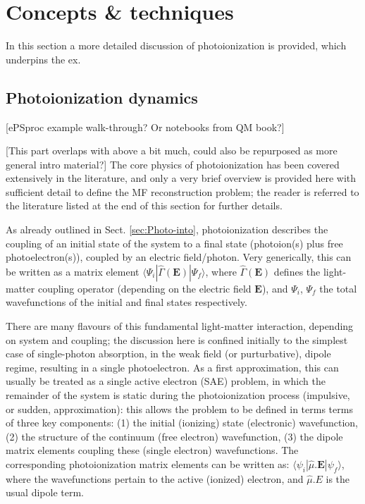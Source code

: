 \section{Concepts \& techniques\label{sec:Concepts}}

In this section a more detailed discussion of photoionization is provided, which underpins the ex.

\subsection{Photoionization dynamics} 
[ePSproc example walk-through? Or notebooks from QM book?]

[This part overlaps with above a bit much, could also be repurposed as more general intro material?]
The core physics of photoionization has been covered extensively in the literature, and only a very brief overview is provided here with sufficient detail to define the MF reconstruction problem; the reader is referred to the literature listed at the end of this section for further details.

As already outlined in Sect. \ref{sec:Photo-into}, photoionization describes the coupling of an initial state of the system to a final state (photoion(s) plus free photoelectron(s)), coupled by an electric field/photon. Very generically, this can be written as a matrix element $\langle\Psi_i|\hat{\Gamma}(\boldsymbol{\mathbf{E}})|\Psi_f\rangle$, where $\hat{\Gamma}(\boldsymbol{\mathbf{E}})$ defines the light-matter coupling operator (depending on the electric field $\boldsymbol{\mathbf{E}}$), and $\Psi_i$, $\Psi_f$ the total wavefunctions of the initial and final states respectively. 

There are many flavours of this fundamental light-matter interaction, depending on system and coupling; the discussion here is confined initially to the simplest case of single-photon absorption, in the weak field (or purturbative), dipole regime, resulting in a single photoelectron.
As a first approximation, this can usually be treated as a single active electron (SAE) problem, in which the remainder of the system is static during the photoionization process (impulsive, or sudden, approximation): this allows the problem to be defined in terms terms of three key components: (1) the initial (ionizing) state (electronic) wavefunction, (2) the structure of the continuum (free electron) wavefunction, (3) the dipole matrix elements coupling these (single electron) wavefunctions. The corresponding photoionization matrix elements can be written as: $\langle\psi_i|\hat{\mu}.\boldsymbol{\mathbf{E}}|\psi_f\rangle$, where the wavefunctions pertain to the active (ionized) electron, and $\hat{\mu}.E$ is the usual dipole term.

